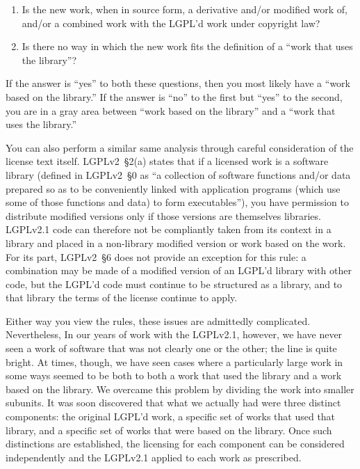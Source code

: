 \begin{enumerate}

\item Is the new work, when in source form, a derivative and/or modified
  work of, and/or a combined work with the LGPL'd work under
  copyright law?

\item Is there no way in which the new work fits the definition of a
  ``work that uses the library''?
\end{enumerate}


If the answer is ``yes'' to both these questions, then you most likely
have a ``work based on the library.''  If the answer is ``no'' to the
first but ``yes'' to the second, you are in a gray area between ``work
based on the library'' and a ``work that uses the library.''

You can also perform a similar same analysis through careful consideration of
the license text itself.  LGPLv2~\S2(a) states that if a licensed work is a
software library (defined in LGPLv2~\S0 as ``a collection of software
functions and/or data prepared so as to be conveniently linked with
application programs (which use some of those functions and data) to form
executables''), you have permission to distribute modified versions only if
those versions are themselves libraries.  LGPLv2.1 code can therefore not be
compliantly taken from its context in a library and placed in a non-library
modified version or work based on the work.  For its part, LGPLv2~\S6 does
not provide an exception for this rule: a combination may be made of a
modified version of an LGPL'd library with other code, but the LGPL'd code
must continue to be structured as a library, and to that library the terms of
the license continue to apply.


Either way you view the rules, these issues are admittedly complicated.
Nevertheless, In our years of work with the LGPLv2.1, however, we have never
seen a work of software that was not clearly one or the other; the line is
quite bright. At times, though, we have seen cases where a particularly large
work in some ways seemed to be both to both a work that used the library and
a work based on the library. We overcame this problem by dividing the work
into smaller subunits.  It was soon discovered that what we actually had were
three distinct components: the original LGPL'd work, a specific set of works
that used that library, and a specific set of works that were based on the
library. Once such distinctions are established, the licensing for each
component can be considered independently and the LGPLv2.1 applied to each
work as prescribed.

